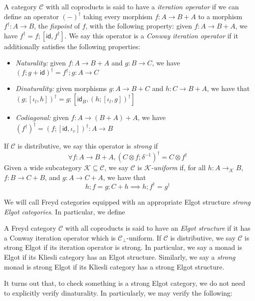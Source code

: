 \documentclass[acmsmall,screen,review]{acmart}
\newcommand{\mc}[1]{\ensuremath{\mathcal{#1}}}
\newcommand{\ms}[1]{\ensuremath{\mathsf{#1}}}
\begin{document}
\begin{definition}
  A category $\mc{C}$ with all coproducts is said to have a \emph{iteration operator} if we can
  define an operator $(-)^\dagger$ taking every morphism $f : A \to B + A$ to a morphism $f^\dagger
  : A \to B$, the \emph{fixpoint} of $f$, with the following property: given $f : A \to B + A$, we
  have $f^\dagger = f;[\ms{id}, f^\dagger]$. We say this operator is a \emph{Conway iteration
  operator} if it additionally satisfies the following properties:
  \begin{itemize}
    \item \emph{Naturality:} given $f : A \to B + A$ and $g : B \to C$, we have
      $
      (f;g + \ms{id})^\dagger = f^\dagger;g : A \to C
      $
    \item \emph{Dinaturality:} given morphisms $g : A \to B + C$ and $h : C \to B + A$, we have that
      $
      (g ; [\iota_l, h])^\dagger = g ; [\ms{id}_B, (h ; [\iota_l, g])^\dagger]
      $
    \item \emph{Codiagonal:} given $f : A \to (B + A) + A$, we have
      $
      (f^\dagger)^\dagger = (f;[\ms{id}, \iota_r])^\dagger : A \to B
      $
  \end{itemize}
  If $\mc{C}$ is distributive, we say this operator is \emph{strong} if
  $$
  \forall f: A \to B + A, (C \otimes f ; \delta^{-1})^\dagger = C \otimes f^\dagger
  $$
  Given a wide subcategory $\mc{K} \subseteq \mc{C}$, we say $\mc{C}$ is \emph{\mc{K}-uniform} if,
  for all $h : A \to_{\mc{K}} B$, $f : B \to C + B$, and $g : A \to C + A$, we have that
  $$
  h ; f = g ; C + h \implies h ; f^\dagger = g^\dagger 
  $$
\end{definition}
We will call Freyd categories equipped with an appropriate Elgot structure \emph{strong Elgot
categories}. In particular, we define
\begin{definition}
  A Freyd category $\mc{C}$ with all coproducts is said to have an \emph{Elgot structure} if it has
  a Conway iteration operator which is $\mc{C}_\bot$-uniform. If $\mc{C}$ is distributive, we say
  $\mc{C}$ is strong Elgot if its iteration operator is strong. In particular, we say a monad is
  Elgot if its Kliesli category has an Elgot structure. Similarly, we say a \emph{strong} monad is
  strong Elgot if its Kliesli category has a strong Elgot structure.
\end{definition}
It turns out that, to check something is a strong Elgot category, we do not need to
explicitly verify dinaturality. In particularly, we may verify the following:
\end{document}
